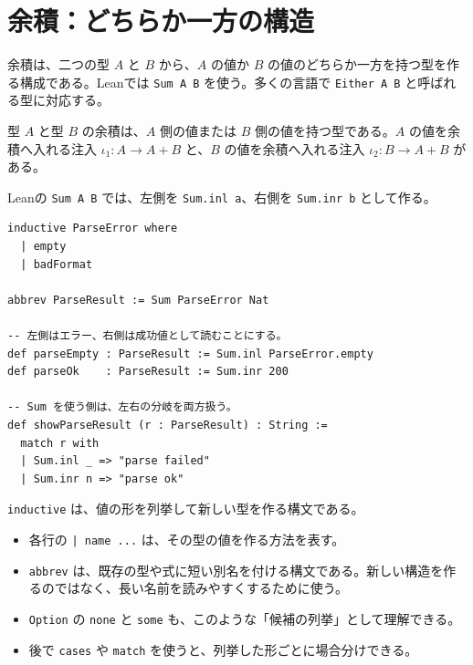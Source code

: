 \section{余積：どちらか一方の構造}
\label{sec:ch07-coproduct}

余積は、二つの型 \(A\) と \(B\) から、\(A\) の値か \(B\) の値のどちらか一方を持つ型を作る構成である。Leanでは \texttt{Sum A B} を使う。多くの言語で \texttt{Either A B} と呼ばれる型に対応する。

\begin{definitionbox}
型 \(A\) と型 \(B\) の余積は、\(A\) 側の値または \(B\) 側の値を持つ型である。\(A\) の値を余積へ入れる注入 \(\iota_1 : A \to A + B\) と、\(B\) の値を余積へ入れる注入 \(\iota_2 : B \to A + B\) がある。
\end{definitionbox}

Leanの \texttt{Sum A B} では、左側を \texttt{Sum.inl a}、右側を \texttt{Sum.inr b} として作る。

\begin{listing}[htbp]
\begin{verbatim}
inductive ParseError where
  | empty
  | badFormat

abbrev ParseResult := Sum ParseError Nat

-- 左側はエラー、右側は成功値として読むことにする。
def parseEmpty : ParseResult := Sum.inl ParseError.empty
def parseOk    : ParseResult := Sum.inr 200

-- Sum を使う側は、左右の分岐を両方扱う。
def showParseResult (r : ParseResult) : String :=
  match r with
  | Sum.inl _ => "parse failed"
  | Sum.inr n => "parse ok"
\end{verbatim}
\caption{Sumの基本操作}
\label{lst:ch07_sum_basic}
\end{listing}

\begin{syntaxbox}
\texttt{inductive} は、値の形を列挙して新しい型を作る構文である。
\begin{itemize}
\item 各行の \texttt{| name ...} は、その型の値を作る方法を表す。
\item \texttt{abbrev} は、既存の型や式に短い別名を付ける構文である。新しい構造を作るのではなく、長い名前を読みやすくするために使う。
\item \texttt{Option} の \texttt{none} と \texttt{some} も、このような「候補の列挙」として理解できる。
\item 後で \texttt{cases} や \texttt{match} を使うと、列挙した形ごとに場合分けできる。
\end{itemize}
\end{syntaxbox}


